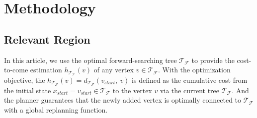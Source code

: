 \section{Methodology}




\subsection{Relevant Region}








In this article, we use the optimal forward-searching tree $\mathcal{T}_{\mathcal{F}}$ to provide the cost-to-come estimation $h_{\mathcal{T}_{\mathcal{F}}}(v)$ of any vertex $v \in \mathcal{T}_{\mathcal{F}}$.
With the optimization objective, the $h_{\mathcal{T}_{\mathcal{F}}}(v) = d_{\mathcal{T}_{\mathcal{F}}}(v_{start}, \ v)$ is defined as the cumulative cost from the initial state $x_{start}=v_{start} \in \mathcal{T}_{\mathcal{F}}$ to the vertex $v$ via the current tree $\mathcal{T}_{\mathcal{F}}$.
And the planner guarantees that the newly added vertex is optimally connected to $\mathcal{T}_{\mathcal{F}}$ with a global replanning function.

